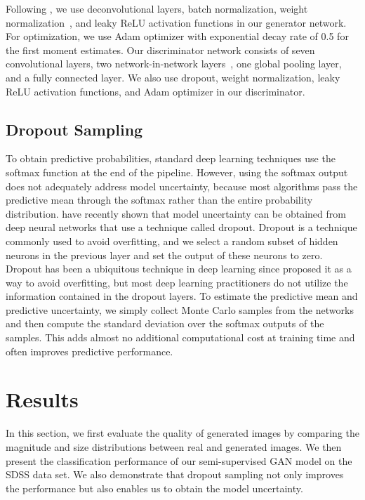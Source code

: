 Following \cite{salimans2016improved}, we use deconvolutional layers, batch normalization, weight normalization~\citep{salimans2016weight},
and leaky ReLU activation functions in our generator network.
For optimization, we use Adam optimizer with exponential decay rate of 0.5 for the first moment estimates.
Our discriminator network consists of seven convolutional layers, two network-in-network layers~\citep{lin2013network}, one global pooling layer,
and a fully connected layer.
We also use dropout, weight normalization, leaky ReLU activation functions, and Adam optimizer in our discriminator.

\subsection{Dropout Sampling}
  \label{sec:dropout_sampling}
 
To obtain predictive probabilities, standard deep learning techniques use the softmax function
at the end of the pipeline.
However, using the softmax output does not adequately address model uncertainty,
because most algorithms pass the predictive mean through the softmax rather than
the entire probability distribution.
\citet{gal2016dropout} have recently shown that model uncertainty
can be obtained from deep neural networks that use a technique called dropout.
Dropout is a technique commonly used to avoid overfitting, and we select a random subset of hidden neurons in the previous layer
and set the output of these neurons to zero.
Dropout has been a ubiquitous technique in deep learning since \citet{hinton2012improving}
proposed it as a way to avoid overfitting, but most deep learning practitioners
do not utilize the information contained in the dropout layers.
To estimate the predictive mean and predictive uncertainty,
we simply collect Monte Carlo samples from the networks and then compute
the standard deviation over the softmax outputs of the samples.
This adds almost no additional computational cost at training time and often improves predictive performance.

\section{Results}
  \label{sec:results}

In this section, we first evaluate the quality of generated images by comparing the magnitude and size distributions
between real and generated images.
We then present the classification performance of our semi-supervised GAN model on the SDSS data set.
We also demonstrate that dropout sampling not only improves the performance but also enables us to obtain the model uncertainty.

